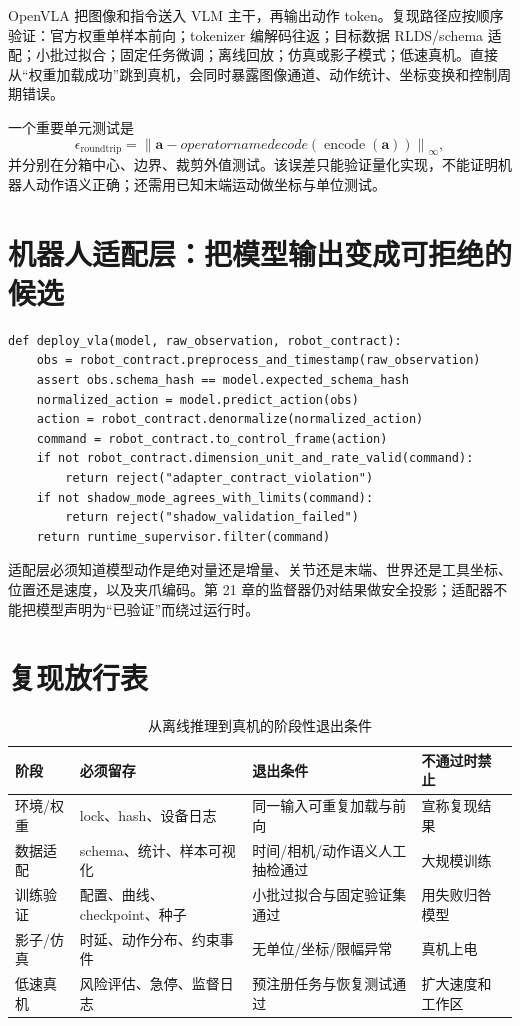 OpenVLA 把图像和指令送入 VLM 主干，再输出动作 token\cite{kim2024openvla}。复现路径应按顺序验证：官方权重单样本前向；tokenizer 编解码往返；目标数据 RLDS/schema 适配；小批过拟合；固定任务微调；离线回放；仿真或影子模式；低速真机。直接从“权重加载成功”跳到真机，会同时暴露图像通道、动作统计、坐标变换和控制周期错误。

一个重要单元测试是
\begin{equation}
\epsilon_{\mathrm{roundtrip}}=
\left\|\boldsymbol a-operatorname{decode}(\operatorname{encode}(\boldsymbol a))\right\|_\infty,
\end{equation}
并分别在分箱中心、边界、裁剪外值测试。该误差只能验证量化实现，不能证明机器人动作语义正确；还需用已知末端运动做坐标与单位测试。

\section{机器人适配层：把模型输出变成可拒绝的候选}

\begin{lstlisting}[caption={部署适配器的最小失败链}]
def deploy_vla(model, raw_observation, robot_contract):
    obs = robot_contract.preprocess_and_timestamp(raw_observation)
    assert obs.schema_hash == model.expected_schema_hash
    normalized_action = model.predict_action(obs)
    action = robot_contract.denormalize(normalized_action)
    command = robot_contract.to_control_frame(action)
    if not robot_contract.dimension_unit_and_rate_valid(command):
        return reject("adapter_contract_violation")
    if not shadow_mode_agrees_with_limits(command):
        return reject("shadow_validation_failed")
    return runtime_supervisor.filter(command)
\end{lstlisting}

适配层必须知道模型动作是绝对量还是增量、关节还是末端、世界还是工具坐标、位置还是速度，以及夹爪编码。第 21 章的监督器仍对结果做安全投影；适配器不能把模型声明为“已验证”而绕过运行时。

\section{复现放行表}

\begin{table}[H]
\centering
\caption{从离线推理到真机的阶段性退出条件}
\label{tab:vla-repro-gates}
\begin{tabularx}{\textwidth}{p{}YYY}
\toprule
阶段 & 必须留存 & 退出条件 & 不通过时禁止 \\
\midrule
环境/权重 & lock、hash、设备日志 & 同一输入可重复加载与前向 & 宣称复现结果 \\
数据适配 & schema、统计、样本可视化 & 时间/相机/动作语义人工抽检通过 & 大规模训练 \\
训练验证 & 配置、曲线、checkpoint、种子 & 小批过拟合与固定验证集通过 & 用失败归咎模型 \\
影子/仿真 & 时延、动作分布、约束事件 & 无单位/坐标/限幅异常 & 真机上电 \\
低速真机 & 风险评估、急停、监督日志 & 预注册任务与恢复测试通过 & 扩大速度和工作区 \\
\bottomrule
\end{tabularx}
\end{table}

